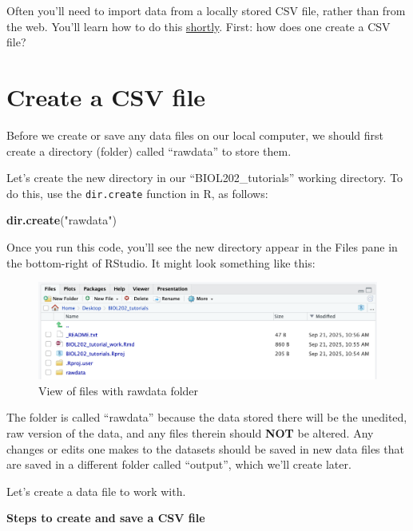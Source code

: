 \documentclass[
]{book}
\newenvironment{Shaded}{\begin{snugshade}}{\end{snugshade}}
\newcommand{\FunctionTok}[1]{\textcolor[rgb]{0.13,0.29,0.53}{\textbf{#1}}}
\newcommand{\NormalTok}[1]{#1}
\newcommand{\StringTok}[1]{\textcolor[rgb]{0.31,0.60,0.02}{#1}}
\begin{document}
Often you'll need to import data from a locally stored CSV file, rather than from the web. You'll learn how to do this \hyperref[import_csv_local]{shortly}. First: how does one create a CSV file?

\section{Create a CSV file}\label{create_csv_local}

Before we create or save any data files on our local computer, we should first create a directory (folder) called ``rawdata'' to store them.

Let's create the new directory in our ``BIOL202\_tutorials'' working directory. To do this, use the \texttt{dir.create} function in R, as follows:

\begin{Shaded}
\begin{Highlighting}[]
\FunctionTok{dir.create}\NormalTok{(}\StringTok{"rawdata"}\NormalTok{)}
\end{Highlighting}
\end{Shaded}

Once you run this code, you'll see the new directory appear in the Files pane in the bottom-right of RStudio. It might look something like this:

\begin{figure}
\includegraphics[width=24.39in]{./more/files_pane_rawdata} \caption{View of files with rawdata folder}\label{fig:unnamed-chunk-19}
\end{figure}

The folder is called ``rawdata'' because the data stored there will be the unedited, raw version of the data, and any files therein should \textbf{NOT} be altered. Any changes or edits one makes to the datasets should be saved in new data files that are saved in a different folder called ``output'', which we'll create later.

Let's create a data file to work with.

\textbf{Steps to create and save a CSV file}
\end{document}
